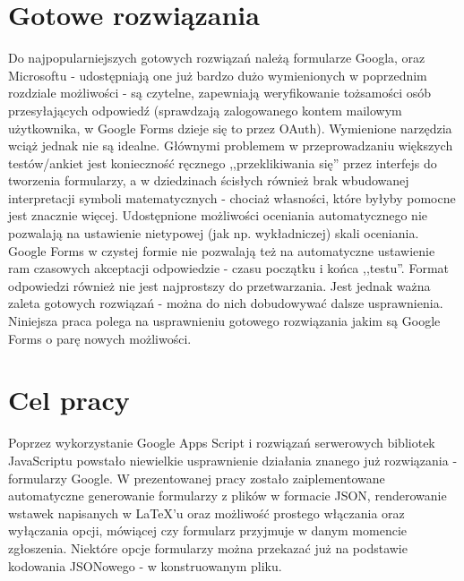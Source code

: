 \section{Gotowe rozwiązania}
Do najpopularniejszych gotowych rozwiązań należą formularze Googla, oraz Microsoftu - udostępniają one już bardzo dużo wymienionych w poprzednim rozdziale możliwości - są czytelne, zapewniają weryfikowanie  tożsamości osób przesyłających odpowiedź (sprawdzają zalogowanego kontem mailowym użytkownika, w Google Forms dzieje się  to przez OAuth).
\ind Wymienione narzędzia wciąż jednak nie są idealne. Głównymi problemem w przeprowadzaniu większych testów/ankiet jest konieczność ręcznego ,,przeklikiwania się'' przez interfejs do tworzenia formularzy, a w dziedzinach ścisłych również brak wbudowanej interpretacji symboli matematycznych - chociaż własności, które byłyby pomocne jest znacznie więcej. Udostępnione możliwości oceniania automatycznego nie pozwalają na ustawienie nietypowej (jak np. wykładniczej) skali oceniania. Google Forms w czystej formie nie pozwalają też na automatyczne ustawienie ram czasowych akceptacji odpowiedzie - czasu początku i końca ,,testu''. Format odpowiedzi również nie jest najprostszy do przetwarzania.
\ind Jest jednak ważna zaleta gotowych rozwiązań - można do nich dobudowywać dalsze usprawnienia. Niniejsza praca polega na usprawnieniu gotowego rozwiązania jakim są Google Forms o parę nowych możliwości.
\section{Cel pracy}
 Poprzez wykorzystanie Google Apps Script  i rozwiązań serwerowych bibliotek JavaScriptu powstało niewielkie usprawnienie działania znanego już rozwiązania - formularzy Google. W prezentowanej pracy zostało zaiplementowane automatyczne generowanie formularzy z plików w formacie JSON, renderowanie wstawek napisanych w \LaTeX{}'u oraz możliwość prostego włączania oraz wyłączania opcji, mówiącej czy formularz przyjmuje w danym momencie zgłoszenia. Niektóre opcje formularzy można  przekazać już na podstawie kodowania JSONowego - w konstruowanym pliku.

